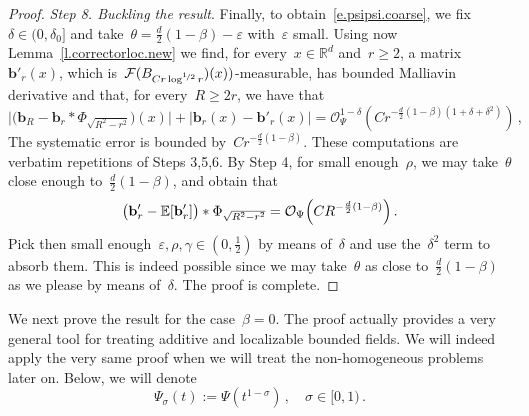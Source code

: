\documentclass[11pt,twoside]{article} %
\numberwithin{equation}{section}
\theoremstyle{definition}
\newcommand*{\R}{\ensuremath{\mathbb{R}}}
\newcommand{\eps}{\varepsilon}
\renewcommand{\b}{\ensuremath{\mathbf{b}}}
\newcommand{\ep}{\eps}
\newcommand{\F}{\mathcal{F}}
\newcommand{\E}{\mathbb{E}}
\renewcommand{\O}{\mathcal{O}}
\begin{document}
\begin{proof}
\smallskip 

\emph{Step 8. Buckling the result}. 
Finally, to obtain~\eqref{e.psipsi.coarse}, we fix~$\delta \in (0,\delta_0]$ and take~$\theta = \frac d2(1-\beta)-\ep$ with~$\ep$ small. Using now Lemma~\ref{l.correctorloc.new} we find, for every~$x \in \R^d$ and~$r \geq 2$, a matrix~$\b'_{r}(x)$, which is~$\F(B_{C r \log^{\nicefrac12} r})(x))$-measurable, has bounded Malliavin derivative and that, for every~$R \geq 2r$, we have that 
\begin{equation}  \label{e.add.local}
\big|
\bigl( \b_R - \b_r \ast \Phi_{\sqrt{R^2-r^2}} \bigr) (x) 
\big|
+
\big| 
\b_r(x)  - \b'_{r}(x)
\big|   
= 
\O_\Psi^{1-\delta}(C r^{-\frac d2 (1-\beta)(1+\delta+\delta^2)})
\,,
\end{equation}
The systematic error is bounded by~$Cr^{-\frac d2 (1-\beta)}$. These computations are verbatim repetitions of Steps 3,5,6. By Step 4,  for small enough~$\rho$, we may take~$\theta$ close enough to~$\frac d2 (1-\beta)$, and obtain that
\begin{equation}  \label{e.br.flucs.again}
\bigl( \b'_{r} - \E [ \b'_{r} ] \bigr) \ast \Phi_{\sqrt{R^2-r^2}} 
= 
 \O_{\Psi} \Bigl( C R^{-\frac d2(1-\beta) } \Bigr) 
\,.
\end{equation}
Pick then small enough~$\ep,\rho,\gamma \in (0,\frac12)$ by means of~$\delta$ and use the~$\delta^2$ term to absorb them. This is indeed possible since we may take~$\theta$ as close to~$\frac d2 (1-\beta)$ as we please by means of~$\delta$. The proof is complete. 
\end{proof}





We next prove the result for the case~$\beta = 0$. The proof actually provides a very general tool for treating additive and localizable bounded fields. We will indeed apply the very same proof when we will treat the non-homogeneous problems later on. Below, we will denote
\begin{equation} 
\label{e.Psi.sigma.def}
\Psi_\sigma(t) := \Psi(t^{1-\sigma})\,, \quad \sigma \in [0,1)\,.
\end{equation}
   
\end{document}
